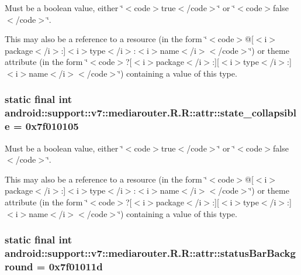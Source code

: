 Must be a boolean value, either \char`\"{}$<$code$>$true$<$/code$>$\char`\"{} or \char`\"{}$<$code$>$false$<$/code$>$\char`\"{}. 

This may also be a reference to a resource (in the form \char`\"{}$<$code$>$@\mbox{[}$<$i$>$package$<$/i$>$:\mbox{]}$<$i$>$type$<$/i$>$:$<$i$>$name$<$/i$>$$<$/code$>$\char`\"{}) or theme attribute (in the form \char`\"{}$<$code$>$?\mbox{[}$<$i$>$package$<$/i$>$:\mbox{]}\mbox{[}$<$i$>$type$<$/i$>$:\mbox{]}$<$i$>$name$<$/i$>$$<$/code$>$\char`\"{}) containing a value of this type. \hypertarget{classandroid_1_1support_1_1v7_1_1mediarouter_1_1_r_1_1attr_674923f0a7ca17f50dbdd3f5d3d0263c}{
\subsubsection[{state\_\-collapsible}]{\setlength{\rightskip}{0pt plus 5cm}static final int android::support::v7::mediarouter.R.R::attr::state\_\-collapsible = 0x7f010105}}
\label{classandroid_1_1support_1_1v7_1_1mediarouter_1_1_r_1_1attr_674923f0a7ca17f50dbdd3f5d3d0263c}


Must be a boolean value, either \char`\"{}$<$code$>$true$<$/code$>$\char`\"{} or \char`\"{}$<$code$>$false$<$/code$>$\char`\"{}. 

This may also be a reference to a resource (in the form \char`\"{}$<$code$>$@\mbox{[}$<$i$>$package$<$/i$>$:\mbox{]}$<$i$>$type$<$/i$>$:$<$i$>$name$<$/i$>$$<$/code$>$\char`\"{}) or theme attribute (in the form \char`\"{}$<$code$>$?\mbox{[}$<$i$>$package$<$/i$>$:\mbox{]}\mbox{[}$<$i$>$type$<$/i$>$:\mbox{]}$<$i$>$name$<$/i$>$$<$/code$>$\char`\"{}) containing a value of this type. \hypertarget{classandroid_1_1support_1_1v7_1_1mediarouter_1_1_r_1_1attr_ca047b66cea143c46c5a7ab379e56bec}{
\subsubsection[{statusBarBackground}]{\setlength{\rightskip}{0pt plus 5cm}static final int android::support::v7::mediarouter.R.R::attr::statusBarBackground = 0x7f01011d}}
\label{classandroid_1_1support_1_1v7_1_1mediarouter_1_1_r_1_1attr_ca047b66cea143c46c5a7ab379e56bec}


